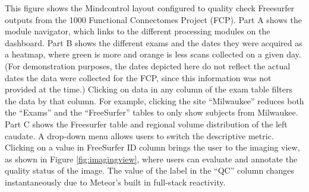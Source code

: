 \label{fig:dashboard}

This figure shows the Mindcontrol layout configured to quality check Freesurfer outputs from the 1000 Functional Connectomes Project (FCP). Part A shows the module navigator, which links to the different processing modules on the dashboard. Part B shows the different exams and the dates they were acquired as a heatmap, where green is more and orange is less scans collected on a given day. (For demonstration purposes, the dates depicted here do not reflect the actual dates the data were collected for the FCP, since this information was not provided at the time.) Clicking on data in any column of the exam table filters the data by that column. For example, clicking the site ``Milwaukee'' reduces both the ``Exams'' and the ``FreeSurfer'' tables to only show subjects from Milwaukee. Part C shows the Freesurfer table and regional volume distribution of the left caudate. A drop-down menu allows users to switch the descriptive metric. Clicking on a value in FreeSurfer ID column brings the user to the imaging view, as shown in Figure \ref{fig:imagingview}, where users can evaluate and annotate the quality status of the image. The value of the label in the ``QC'' column changes instantaneously due to Meteor's built in full-stack reactivity. 